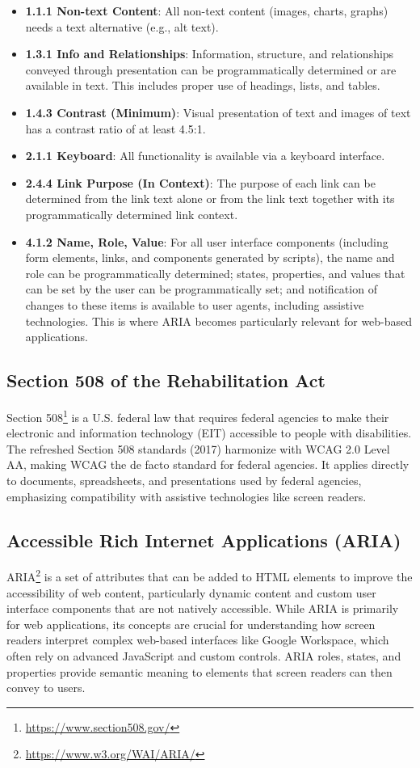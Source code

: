 \begin{itemize}
    \item \textbf{1.1.1 Non-text Content}: All non-text content (images, charts, graphs) needs a text alternative (e.g., alt text).
    \item \textbf{1.3.1 Info and Relationships}: Information, structure, and relationships conveyed through presentation can be programmatically determined or are available in text. This includes proper use of headings, lists, and tables.
    \item \textbf{1.4.3 Contrast (Minimum)}: Visual presentation of text and images of text has a contrast ratio of at least 4.5:1.
    \item \textbf{2.1.1 Keyboard}: All functionality is available via a keyboard interface.
    \item \textbf{2.4.4 Link Purpose (In Context)}: The purpose of each link can be determined from the link text alone or from the link text together with its programmatically determined link context.
    \item \textbf{4.1.2 Name, Role, Value}: For all user interface components (including form elements, links, and components generated by scripts), the name and role can be programmatically determined; states, properties, and values that can be set by the user can be programmatically set; and notification of changes to these items is available to user agents, including assistive technologies. This is where ARIA becomes particularly relevant for web-based applications.
\end{itemize}

\subsection{Section 508 of the Rehabilitation Act}
Section 508\footnote{\url{https://www.section508.gov/}} is a U.S. federal law that requires federal agencies to make their electronic and information technology (EIT) accessible to people with disabilities. The refreshed Section 508 standards (2017) harmonize with WCAG 2.0 Level AA, making WCAG the de facto standard for federal agencies. It applies directly to documents, spreadsheets, and presentations used by federal agencies, emphasizing compatibility with assistive technologies like screen readers.

\subsection{Accessible Rich Internet Applications (ARIA)}
ARIA\footnote{\url{https://www.w3.org/WAI/ARIA/}} is a set of attributes that can be added to HTML elements to improve the accessibility of web content, particularly dynamic content and custom user interface components that are not natively accessible. While ARIA is primarily for web applications, its concepts are crucial for understanding how screen readers interpret complex web-based interfaces like Google Workspace, which often rely on advanced JavaScript and custom controls. ARIA roles, states, and properties provide semantic meaning to elements that screen readers can then convey to users.

